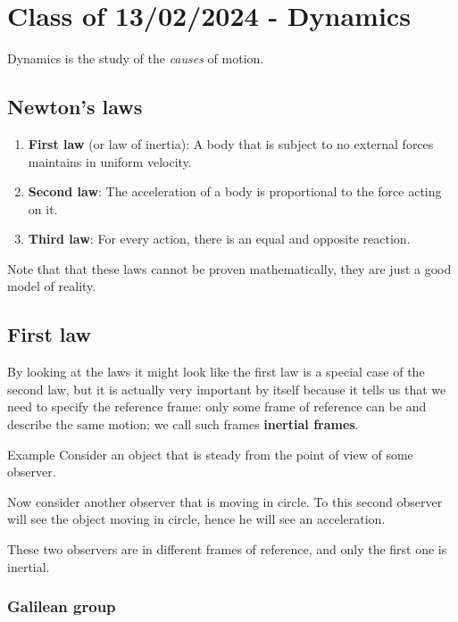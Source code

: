 \documentclass[10pt]{extarticle}
\begin{document}
\section{Class of 13/02/2024 - Dynamics}

Dynamics is the study of the \textit{causes} of motion.

\subsection{Newton's laws}

\begin{enumerate}
    \item \textbf{First law} (or law of inertia): A body that is subject to no external forces maintains in uniform velocity.
    \item \textbf{Second law}: The acceleration of a body is proportional to the force acting on it.
    \item \textbf{Third law}: For every action, there is an equal and opposite reaction.
\end{enumerate}

Note that that these laws cannot be proven mathematically, they are just a good model of reality.

\subsection{First law}

By looking at the laws it might look like the first law is a special case of the second law,
but it is actually very important by itself because it tells us that we need to specify the reference frame:
only some frame of reference can be  and describe the same motion; we call such frames \textbf{inertial frames}.

\begin{examplebox}{Example}
    Consider an object that is steady from the point of view of some observer.

    Now consider another observer that is moving in circle.
    To this second observer will see the object moving in circle, hence he will see an acceleration.

    These two observers are in different frames of reference, and only the first one is inertial.
\end{examplebox}

\subsubsection{Galilean group}
\end{document}
